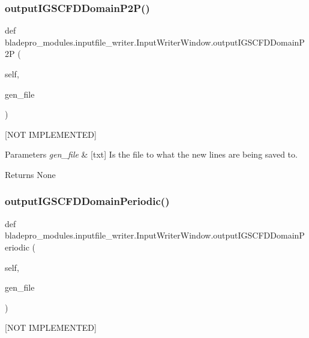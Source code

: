 \subsubsection{\texorpdfstring{output\+I\+G\+S\+C\+F\+D\+Domain\+P2\+P()}{outputIGSCFDDomainP2P()}}
{\footnotesize\ttfamily def bladepro\+\_\+modules.\+inputfile\+\_\+writer.\+Input\+Writer\+Window.\+output\+I\+G\+S\+C\+F\+D\+Domain\+P2P (\begin{DoxyParamCaption}\item[{}]{self,  }\item[{}]{gen\+\_\+file }\end{DoxyParamCaption})}



\mbox{[}N\+OT I\+M\+P\+L\+E\+M\+E\+N\+T\+ED\mbox{]} 


\begin{DoxyParams}{Parameters}
{\em gen\+\_\+file} & \mbox{[}txt\mbox{]} Is the file to what the new lines are being saved to. \\
\hline
\end{DoxyParams}
\begin{DoxyReturn}{Returns}
None 
\end{DoxyReturn}
\hypertarget{a00073_a3093ea91273711f4b82aa878c0204407}{}\label{a00073_a3093ea91273711f4b82aa878c0204407} 
\subsubsection{\texorpdfstring{output\+I\+G\+S\+C\+F\+D\+Domain\+Periodic()}{outputIGSCFDDomainPeriodic()}}
{\footnotesize\ttfamily def bladepro\+\_\+modules.\+inputfile\+\_\+writer.\+Input\+Writer\+Window.\+output\+I\+G\+S\+C\+F\+D\+Domain\+Periodic (\begin{DoxyParamCaption}\item[{}]{self,  }\item[{}]{gen\+\_\+file }\end{DoxyParamCaption})}



\mbox{[}N\+OT I\+M\+P\+L\+E\+M\+E\+N\+T\+ED\mbox{]} 


